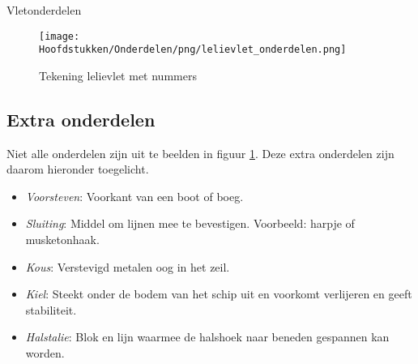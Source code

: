 \begin{table}[h!]
\centering
\caption{Vletonderdelen}

\setlength\extrarowheight{5pt} %
\renewcommand{\arraystretch}{0.75} %
\newcommand{\tabhead}[1]{\cellcolor{ocre}{\color[HTML]{FFFFFF}\sffamily \textbf{#1}}}
\newcommand{\NIL}[1]{\cellcolor{not}{#1}}
\label{table:vletwel}



\setlength\extrarowheight{0pt} %
\renewcommand{\arraystretch}{1} %

\end{table}
\newpage
\begin{figure}[h!]
    \centering
    \texttt{[image: Hoofdstukken/Onderdelen/png/lelievlet\_onderdelen.png]}
    \caption{Tekening lelievlet met nummers \protect\footnotemark}
    \centering
    \label{pic:vlet_nummers}
\end{figure}

\subsection{Extra onderdelen}
\label{ss:extra}
Niet alle onderdelen zijn uit te beelden in figuur \ref{pic:vlet_nummers}. Deze extra onderdelen zijn daarom hieronder toegelicht.
\vspace*{-0.2cm}
\begin{itemize}
	\item \textit{Voorsteven}: Voorkant van een boot of boeg.
	\item \textit{Sluiting}: Middel om lijnen mee te bevestigen. Voorbeeld: harpje of musketonhaak.
	\item \textit{Kous}: Verstevigd metalen oog in het zeil.
	\item \textit{Kiel}: Steekt onder de bodem van het schip uit en voorkomt verlijeren en geeft stabiliteit.
	\item \textit{Halstalie}: Blok en lijn waarmee de halshoek naar beneden gespannen kan worden.
\end{itemize}

\newpage

